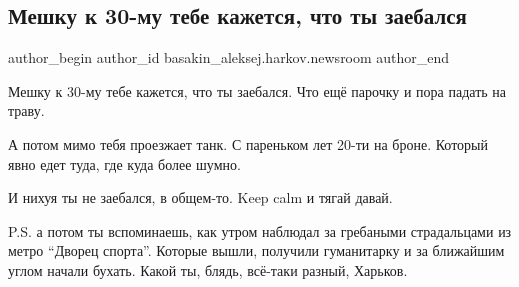  
 
 
 
 
 
\subsection{Мешку к 30-му тебе кажется, что ты заебался}
\label{sec:14_05_2022.fb.basakin_aleksej.harkov.newsroom.1.meshok}
 
\ifcmt
 author_begin
   author_id basakin_aleksej.harkov.newsroom
 author_end
\fi

Мешку к 30-му тебе кажется, что ты заебался. Что ещё парочку и пора падать на
траву.

А потом мимо тебя проезжает танк. С пареньком лет 20-ти на броне. Который явно
едет туда, где куда более шумно.

И нихуя ты не заебался, в общем-то. Keep calm и тягай давай.


P.S. а потом ты вспоминаешь, как утром наблюдал за гребаными страдальцами из
метро \enquote{Дворец спорта}. Которые вышли, получили гуманитарку и за ближайшим углом
начали бухать. Какой ты, блядь, всё-таки разный, Харьков.

